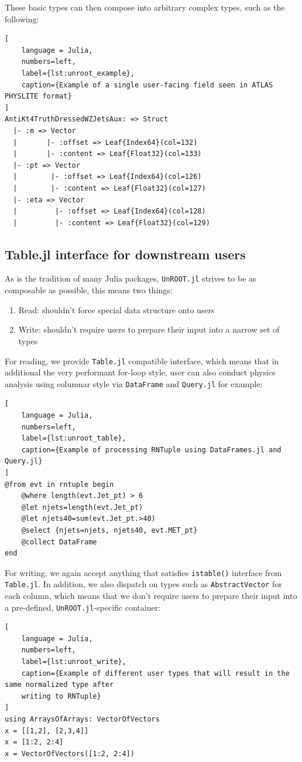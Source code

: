 \documentclass{juliacon}
\begin{document}
These basic types can then compose into arbitrary complex types, such as the following:
\begin{lstlisting}[
    language = Julia, 
    numbers=left, 
    label={lst:unroot_example}, 
    caption={Example of a single user-facing field seen in ATLAS PHYSLITE format}
]
AntiKt4TruthDressedWZJetsAux: => Struct
  |- :m => Vector
  |       |- :offset => Leaf{Index64}(col=132)
  |       |- :content => Leaf{Float32}(col=133)
  |- :pt => Vector
  |        |- :offset => Leaf{Index64}(col=126)
  |        |- :content => Leaf{Float32}(col=127)
  |- :eta => Vector
  |         |- :offset => Leaf{Index64}(col=128)
  |         |- :content => Leaf{Float32}(col=129)
\end{lstlisting}

\subsection{Table.jl interface for downstream users}

As is the tradition of many Julia packages, \verb|UnROOT.jl| strives to be as composable as
possible, this means two things:
\begin{enumerate}
    \item Read: shouldn’t force special data structure onto users

    \item Write: shouldn’t require users to prepare their input into a narrow set of types

\end{enumerate}

For reading, we provide \verb|Table.jl| compatible interface, which means that in additional the
very performant for-loop style, user can also conduct physics analysis using columnar style via
\verb|DataFrame| and \verb|Query.jl| for example:

\begin{lstlisting}[
    language = Julia, 
    numbers=left, 
    label={lst:unroot_table}, 
    caption={Example of processing RNTuple using DataFrames.jl and Query.jl}
]
@from evt in rntuple begin
    @where length(evt.Jet_pt) > 6
    @let njets=length(evt.Jet_pt)
    @let njets40=sum(evt.Jet_pt.>40)
    @select {njets=njets, njets40, evt.MET_pt}
    @collect DataFrame
end
\end{lstlisting}

For writing, we again accept anything that satisfies \verb|istable()| interface from \verb|Table.jl|. In
addition, we also dispatch on types such as \verb|AbstractVector| for each column, which means that
we don't require users to prepare their input into a pre-defined, \verb|UnROOT.jl|-specific container:
\begin{lstlisting}[
    language = Julia, 
    numbers=left, 
    label={lst:unroot_write}, 
    caption={Example of different user types that will result in the same normalized type after
    writing to RNTuple}
]
using ArraysOfArrays: VectorOfVectors
x = [[1,2], [2,3,4]]
x = [1:2, 2:4]
x = VectorOfVectors([1:2, 2:4])
\end{lstlisting}
\end{document}
